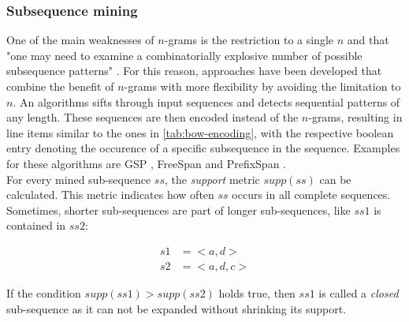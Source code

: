 \subsubsection*{Subsequence mining}
One of the main weaknesses of $n$-grams is the restriction to a single $n$ and that "one may need to examine a combinatorially explosive
number of possible subsequence patterns" \cite{pei2001prefixspan}. For this reason, approaches have been developed that combine the benefit of $n$-grams with more flexibility by avoiding the limitation to $n$. An algorithms sifts through input sequences and detects sequential patterns of any length. These sequences are then encoded instead of the $n$-grams, resulting in line items similar to the ones in \autoref{tab:bow-encoding}, with the respective boolean entry denoting the occurence of a specific subsequence in the sequence. Examples for these algorithms are GSP \cite{srikant1996gsp}, FreeSpan \cite{han2000freespan} and PrefixSpan \cite{pei2001prefixspan}.\\

For every mined sub-sequence $ss$, the \textit{support} metric $supp(ss)$ can be calculated. This metric indicates how often $ss$ occurs in all complete sequences. Sometimes, shorter sub-sequences are part of longer sub-sequences, like $ss1$ is contained in $ss2$:

\begin{equation*}
\begin{split}
s1 &= <a,d>\\
s2 &= <a,d,c>
\end{split}
\end{equation*}

If the condition $supp(ss1)>supp(ss2)$ holds true, then $ss1$ is called a \textit{closed} sub-sequence as it can not be expanded without shrinking its support.
